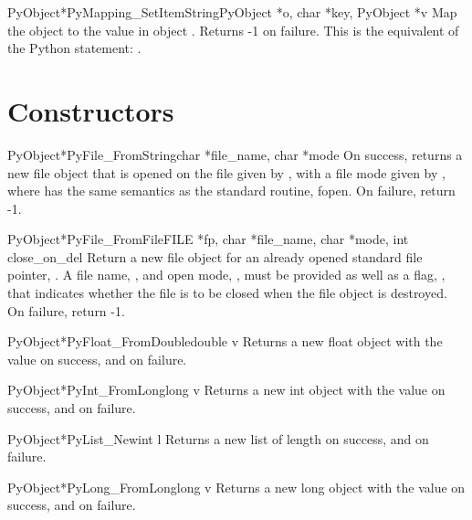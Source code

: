 \documentclass[twoside,openright]{report}
\begin{document}
\begin{cfuncdesc}{PyObject*}{PyMapping_SetItemString}{PyObject *o, char *key, PyObject *v}
Map the object  to the value  in object .  Returns 
-1 on failure.  This is the equivalent of the Python
statement: .
\end{cfuncdesc}


\section{Constructors}

\begin{cfuncdesc}{PyObject*}{PyFile_FromString}{char *file_name, char *mode}
On success, returns a new file object that is opened on the
file given by , with a file mode given by ,
where  has the same semantics as the standard \C{} routine,
fopen.  On failure, return -1.
\end{cfuncdesc}

\begin{cfuncdesc}{PyObject*}{PyFile_FromFile}{FILE *fp, char *file_name, char *mode, int close_on_del}
Return a new file object for an already opened standard \C{}
file pointer, .  A file name, , and open mode,
, must be provided as well as a flag, , that
indicates whether the file is to be closed when the file
object is destroyed.  On failure, return -1.
\end{cfuncdesc}

\begin{cfuncdesc}{PyObject*}{PyFloat_FromDouble}{double v}
Returns a new float object with the value  on success, and
\NULL{} on failure.
\end{cfuncdesc}

\begin{cfuncdesc}{PyObject*}{PyInt_FromLong}{long v}
Returns a new int object with the value  on success, and
\NULL{} on failure.
\end{cfuncdesc}

\begin{cfuncdesc}{PyObject*}{PyList_New}{int l}
Returns a new list of length  on success, and \NULL{} on
failure.
\end{cfuncdesc}

\begin{cfuncdesc}{PyObject*}{PyLong_FromLong}{long v}
Returns a new long object with the value  on success, and
\NULL{} on failure.
\end{cfuncdesc}
\end{document}
